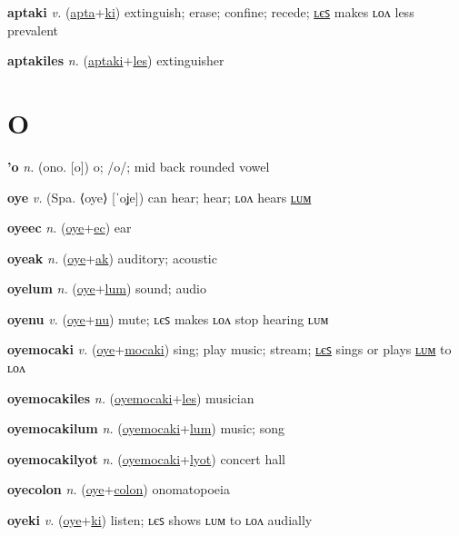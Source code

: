 \textbf{\hypertarget{aptaki}{aptaki}} \textit{v.} (\hyperlink{apta}{apta}+\allowbreak \hyperlink{ki}{ki})
extinguish; erase; confine; recede; \hyperlink{aptakiles}{ʟєꜱ} makes ʟᴏᴧ less prevalent

\textbf{\hypertarget{aptakiles}{aptakiles}} \textit{n.} (\hyperlink{aptaki}{aptaki}+\allowbreak \hyperlink{les}{les})
extinguisher

\section{O}

\textbf{\hypertarget{'o}{'o}} \textit{n.} (ono. [o])
o; /o/; mid back rounded vowel

\textbf{\hypertarget{oye}{oye}} \textit{v.} (Spa. ⟨oye⟩ [ˈoʝe])
can hear; hear; ʟᴏᴧ hears \hyperlink{oyelum}{ʟᴜᴍ}

\textbf{\hypertarget{oyeec}{oyeec}} \textit{n.} (\hyperlink{oye}{oye}+\allowbreak \hyperlink{ec}{ec})
ear

\textbf{\hypertarget{oyeak}{oyeak}} \textit{n.} (\hyperlink{oye}{oye}+\allowbreak \hyperlink{ak}{ak})
auditory; acoustic

\textbf{\hypertarget{oyelum}{oyelum}} \textit{n.} (\hyperlink{oye}{oye}+\allowbreak \hyperlink{lum}{lum})
sound; audio

\textbf{\hypertarget{oyenu}{oyenu}} \textit{v.} (\hyperlink{oye}{oye}+\allowbreak \hyperlink{nu}{nu})
mute; ʟєꜱ makes ʟᴏᴧ stop hearing ʟᴜᴍ

\textbf{\hypertarget{oyemocaki}{oyemocaki}} \textit{v.} (\hyperlink{oye}{oye}+\allowbreak \hyperlink{mocaki}{mocaki})
sing; play music; stream; \hyperlink{oyemocakiles}{ʟєꜱ} sings or plays \hyperlink{oyemocakilum}{ʟᴜᴍ} to ʟᴏᴧ

\textbf{\hypertarget{oyemocakiles}{oyemocakiles}} \textit{n.} (\hyperlink{oyemocaki}{oyemocaki}+\allowbreak \hyperlink{les}{les})
musician

\textbf{\hypertarget{oyemocakilum}{oyemocakilum}} \textit{n.} (\hyperlink{oyemocaki}{oyemocaki}+\allowbreak \hyperlink{lum}{lum})
music; song

\textbf{\hypertarget{oyemocakilyot}{oyemocakilyot}} \textit{n.} (\hyperlink{oyemocaki}{oyemocaki}+\allowbreak \hyperlink{lyot}{lyot})
concert hall

\textbf{\hypertarget{oyecolon}{oyecolon}} \textit{n.} (\hyperlink{oye}{oye}+\allowbreak \hyperlink{colon}{colon})
onomatopoeia

\textbf{\hypertarget{oyeki}{oyeki}} \textit{v.} (\hyperlink{oye}{oye}+\allowbreak \hyperlink{ki}{ki})
listen; ʟєꜱ shows ʟᴜᴍ to ʟᴏᴧ audially

